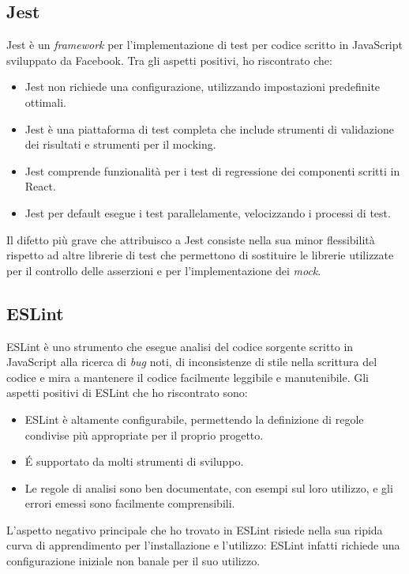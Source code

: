
\subsection{Jest}

Jest è un \emph{framework} per l'implementazione di test per codice scritto in JavaScript sviluppato da Facebook.
Tra gli aspetti positivi, ho riscontrato che:
\begin{itemize}
	\item Jest non richiede una configurazione, utilizzando impostazioni predefinite ottimali.
	\item Jest è una piattaforma di test completa che include strumenti di validazione dei risultati e strumenti per il \gls{mocking}.
	\item Jest comprende funzionalità per i test di regressione dei componenti scritti in React.
	\item Jest per default esegue i test parallelamente, velocizzando i processi di test.
\end{itemize}
Il difetto più grave che attribuisco a Jest consiste nella sua minor flessibilità rispetto ad altre librerie di test che permettono di sostituire le librerie utilizzate per il controllo delle asserzioni e per l'implementazione dei \emph{mock}.

\subsection{ESLint}

ESLint è uno strumento che esegue analisi del codice sorgente scritto in JavaScript alla ricerca di \emph{bug} noti, di inconsistenze di stile nella scrittura del codice e mira a mantenere il codice facilmente leggibile e manutenibile.
Gli aspetti positivi di ESLint che ho riscontrato sono:
\begin{itemize}
	\item ESLint è altamente configurabile, permettendo la definizione di regole condivise più appropriate per il proprio progetto.
	\item É supportato da molti strumenti di sviluppo.
	\item Le regole di analisi sono ben documentate, con esempi sul loro utilizzo, e gli errori emessi sono facilmente comprensibili.
\end{itemize}
L'aspetto negativo principale che ho trovato in ESLint risiede nella sua ripida curva di apprendimento per l'installazione e l'utilizzo: ESLint infatti richiede una configurazione iniziale non banale per il suo utilizzo.

